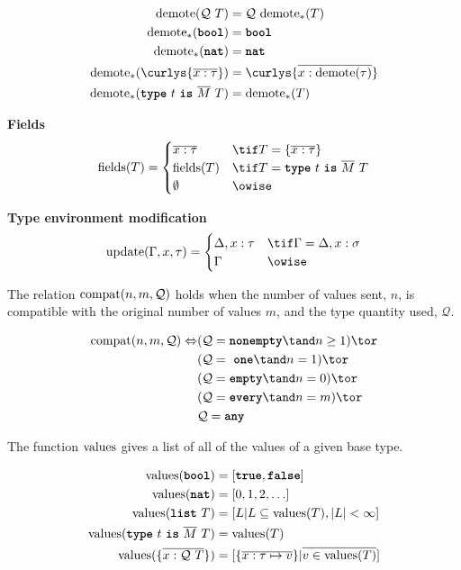 \documentclass[10pt]{article}
\begin{document}
\begin{align*}
    \demoteT(\mathcal{Q}~T) &= \mathcal{Q}~\demoteT_*(T) \\
    \demoteT_*(\boolt) &= \boolt \\
    \demoteT_*(\natt) &= \natt \\
    \demoteT_*(\curlys{\overline{x : \tau}}) &= \curlys{\overline{x : \demoteT(\tau)}} \\
    \demoteT_*(\type~t~\is~\overline{M}~T) &= \demoteT_*(T)
\end{align*}

 \textbf{Fields}
\begin{align*}
    \fields(T) =
    \begin{cases}
        \overline{x : \tau} & \tif T = \{ \overline{x : \tau} \} \\
        \fields(T) & \tif T = \type~t~\is~\overline{M}~T \\
        \emptyset & \owise
    \end{cases}
\end{align*}

 \textbf{Type environment modification}
\[
    \update(\Gamma, x, \tau) =
    \begin{cases}
        \Delta, x : \tau & \tif \Gamma = \Delta, x : \sigma \\
        \Gamma & \owise
    \end{cases}
\]

The relation $\text{compat}(n, m, \mathcal{Q})$ holds when the number of values sent, $n$, is compatible with the original number of values $m$, and the type quantity used, $\mathcal{Q}$.

\begin{align*}
    \compat(n, m, \mathcal{Q}) \iff & (\mathcal{Q} = \nonempty \tand n \geq 1) \tor \\
                                    & (\mathcal{Q} = \,\,\exactlyone \tand n = 1) \tor \\
                                    & (\mathcal{Q} = \emptyq \tand n = 0) \tor \\
                                    & (\mathcal{Q} = \every \tand n = m) \tor \\
                                    & \mathcal{Q} = \any
\end{align*}

The function $\text{values}$ gives a list of all of the values of a given base type.

\begin{align*}
    \text{values}(\textbf{\texttt{bool}}) & = [ \textbf{\texttt{true}}, \textbf{\texttt{false}} ] \\
    \text{values}(\textbf{\texttt{nat}}) & = [ 0, 1, 2, \ldots ] \\
    \text{values}(\textbf{\texttt{list}}~T) & = [ L | L \subseteq \text{values}(T), |L| < \infty ] \\
    \text{values}(\textbf{\texttt{type}}~t~\textbf{\texttt{is}}~\overline{M}~T) &= \text{values}(T) \\
    \text{values}(\{ \overline{x : \mathcal{Q}~T} \}) &= [ \{ \overline{x : \tau \mapsto v} \} | \overline{v \in \text{values}(T)} ]
\end{align*}
\end{document}
